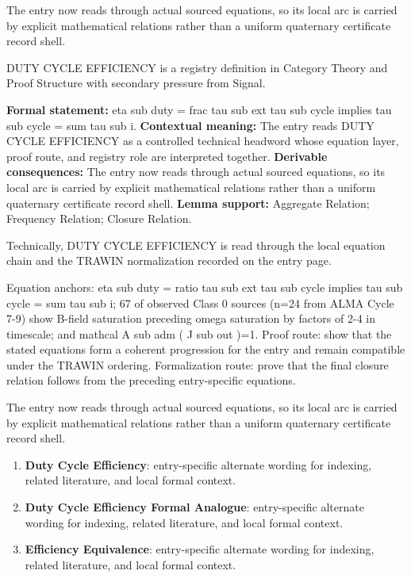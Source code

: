 The entry now reads through actual sourced equations, so its local arc is carried by explicit mathematical relations rather than a uniform quaternary certificate record shell.
\clearpage


\begingroup\small
{}
DUTY CYCLE EFFICIENCY is a registry definition in Category Theory and Proof Structure with secondary pressure from Signal.

\begingroup\footnotesize\setlength{\emergencystretch}{3em}\sloppy
\textbf{Formal statement:} eta sub duty = frac tau sub ext tau sub cycle implies tau sub cycle = sum tau sub i. \textbf{Contextual meaning:} The entry reads DUTY CYCLE EFFICIENCY as a controlled technical headword whose equation layer, proof route, and registry role are interpreted together. \textbf{Derivable consequences:} The entry now reads through actual sourced equations, so its local arc is carried by explicit mathematical relations rather than a uniform quaternary certificate record shell. \textbf{Lemma support:} Aggregate Relation; Frequency Relation; Closure Relation.\par
\endgroup

Technically, DUTY CYCLE EFFICIENCY is read through the local equation chain and the TRAWIN normalization recorded on the entry page.

Equation anchors: eta sub duty = ratio tau sub ext tau sub cycle implies tau sub cycle = sum tau sub i; 67 of observed Class 0 sources (n=24 from ALMA Cycle 7-9) show B-field saturation preceding omega saturation by factors of 2-4 in timescale; and mathcal A sub adm ( J sub out )=1. Proof route: show that the stated equations form a coherent progression for the entry and remain compatible under the TRAWIN ordering. Formalization route: prove that the final closure relation follows from the preceding entry-specific equations.

The entry now reads through actual sourced equations, so its local arc is carried by explicit mathematical relations rather than a uniform quaternary certificate record shell.
\endgroup

\begin{enumerate}[leftmargin=1.6em,itemsep=6pt,topsep=4pt]
\item \textbf{Duty Cycle Efficiency}: entry-specific alternate wording for indexing, related literature, and local formal context.
\item \textbf{Duty Cycle Efficiency Formal Analogue}: entry-specific alternate wording for indexing, related literature, and local formal context.
\item \textbf{Efficiency Equivalence}: entry-specific alternate wording for indexing, related literature, and local formal context.
\end{enumerate}


